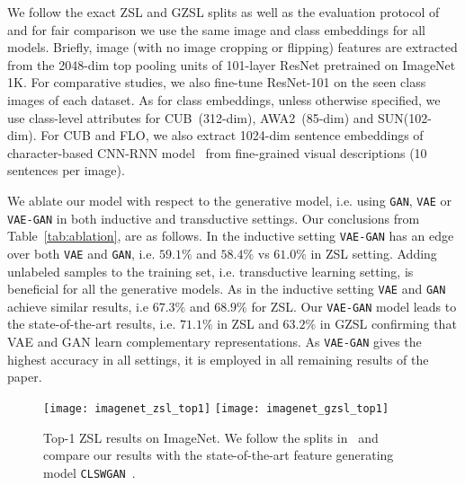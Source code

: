 \documentclass[10pt,twocolumn,letterpaper]{article}
\newcommand{\myparagraph}[1]{\vspace{5pt}\noindent{\bf #1}}
\begin{document}
We follow the exact ZSL and GZSL splits as well as the evaluation protocol of~\cite{xian2018zero} and for fair comparison we use the same image and class embeddings for all models. Briefly, image (with no image cropping or flipping) features are extracted from the 2048-dim top pooling units of 101-layer ResNet pretrained  on ImageNet 1K. For comparative studies, we also fine-tune ResNet-101 on the seen class images of each dataset. As for class embeddings, unless otherwise specified, we use class-level attributes for CUB~(312-dim), AWA2~(85-dim) and SUN(102-dim). For CUB and FLO, we also extract 1024-dim sentence embeddings of character-based CNN-RNN model~\cite{RALS16} from fine-grained visual descriptions (10 sentences per image). 

\myparagraph{Ablation study.} We ablate our model with respect to the generative model, i.e. using \texttt{GAN}, \texttt{VAE} or \texttt{VAE-GAN} in both inductive and transductive settings. Our conclusions from Table~\ref{tab:ablation}, are as follows. In the inductive setting \texttt{VAE-GAN} has an edge over both \texttt{VAE} and \texttt{GAN}, i.e. $59.1\%$  and $58.4\%$  vs $61.0\%$ in ZSL setting. Adding unlabeled samples to the training set, i.e. transductive learning setting, is beneficial for all the generative models. As in the inductive setting \texttt{VAE} and \texttt{GAN} achieve similar results, i.e $67.3\%$ and $68.9\%$ for ZSL. Our \texttt{VAE-GAN} model leads to the state-of-the-art results, i.e. $71.1\%$ in ZSL and $63.2\%$ in GZSL confirming that VAE and GAN learn complementary representations. As \texttt{VAE-GAN} gives the highest accuracy in all settings, it is employed in all remaining results of the paper.

\begin{figure}[t]
	\centering
		\texttt{[image: imagenet\_zsl\_top1]}
        \texttt{[image: imagenet\_gzsl\_top1]}
	\caption{Top-1 ZSL results on ImageNet. We follow the splits in~\cite{xian2018zero} and compare our results with the state-of-the-art feature generating model \texttt{CLSWGAN}~\cite{XLSA18}.}
	\label{fig:imagenet}
\end{figure}
\end{document}

